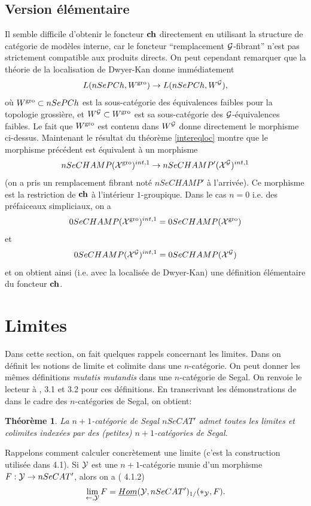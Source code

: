 \documentclass[12pt]{article}
\newcommand{\numero}[1]{\newpage\section{#1}}
\newcommand{\subnumero}[1]{\subsection*{#1}\phantomsection\addcontentsline{toc}{subsection}{#1}}
\newtheorem{theoreme}[lemma]{Th\'eor\`eme}
\newcommand{\Gg}{{\cal G}}
\newcommand{\Xx}{{\cal X}}
\newcommand{\Yy}{{\cal Y}}
\begin{document}
\subnumero{Version \'el\'ementaire}
Il semble difficile d'obtenir le foncteur ${\bf ch}$ directement en utilisant la
structure de cat\'egorie de  mod\`eles interne, car le foncteur ``remplacement
$\Gg$-fibrant'' n'est pas strictement compatible aux produits directs.
On peut cependant remarquer que la th\'eorie de la localisation de Dwyer-Kan
donne imm\'ediatement
$$
L(nSePCh , W^{\rm gro}) \rightarrow L(nSePCh, W^{\Gg}),
$$
o\`u $W^{\rm gro}\subset nSePCh$ est la sous-cat\'egorie
des \'equivalences faibles  pour la topologie grossi\`ere, et
$W^{\Gg}\subset W^{\rm gro}$ est sa sous-cat\'egorie des $\Gg$-\'equivalences
faibles.
Le fait que $W^{\rm gro}$ est contenu dans $W^{\Gg}$ donne directement le
morphisme ci-dessus.
Maintenant le r\'esultat du th\'eor\`eme
\ref{intereqloc}
montre que le morphisme pr\'ec\'edent est \'equivalent \`a un morphisme
$$
nSeCHAMP(\Xx ^{\rm gro})^{int, 1}\rightarrow
nSeCHAMP'(\Xx ^{\Gg})^{int, 1}
$$
(on a pris un remplacement fibrant not\'e $nSeCHAMP'$ \`a l'arriv\'ee).
Ce  morphisme est la restriction de ${\bf ch}$ \`a l'int\'erieur $1$-groupique.
Dans le cas $n=0$ i.e. des pr\'efaiceaux simpliciaux, on a
$$
0SeCHAMP(\Xx ^{\rm gro})^{int, 1}=0SeCHAMP(\Xx ^{\rm gro})
$$
et
$$
0SeCHAMP(\Xx ^{\Gg})^{int, 1}=0SeCHAMP(\Xx ^{\Gg})
$$
et on obtient ainsi (i.e. avec la localis\'ee de Dwyer-Kan) une d\'efinition
\'el\'ementaire du foncteur ${\bf ch}$.

\numero{Limites}

\label{limitespage}

Dans cette section, on fait quelques rappels concernant
les limites. Dans \cite{limits}
on d\'efinit les notions de limite et colimite dans une $n$-cat\'egorie.
On peut donner les m\^emes
d\'efinitions {\em mutatis mutandis} dans une $n$-cat\'egorie de
Segal. On renvoie le lecteur \`a \cite{limits}, 3.1 et 3.2 pour ces
d\'efinitions. En transcrivant les d\'emonstrations de \cite{limits}
dans le cadre des $n$-cat\'egories de Segal, on obtient:

\begin{theoreme}
La $n+1$-cat\'egorie de Segal $nSeCAT'$ admet toutes les limites et colimites
index\'ees par des (petites) $n+1$-cat\'egories de Segal.
\end{theoreme}

Rappelons comment calculer concr\`etement une limite (c'est la construction
utilis\'ee dans \cite{limits} 4.1). Si $\Yy$ est une $n+1$-cat\'egorie
munie d'un morphisme $F: \Yy \rightarrow nSeCAT'$, alors
on a (\cite{limits} 4.1.2)
$$
\lim _{\leftarrow , \Yy} F
= \underline{Hom}(\Yy , nSeCAT')_{1/}(\ast _{\Yy}, F).
$$
\end{document}
